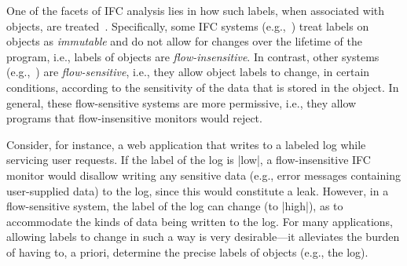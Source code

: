 One of the facets of IFC analysis lies in how such labels, when associated with
objects, are treated~\cite{Hunt:2006}.
%
Specifically, some IFC systems (e.g.,~\cite{Breeze, Aeolus, stefan:lio,
stefan:addressing-covert, zeldovich:histar, Efstathopoulos:2005, krohn:flume})
treat labels on objects as \emph{immutable} and do not allow for changes over
the lifetime of the program, i.e., labels of objects are \emph{flow-insensitive}.
%
In contrast, other systems (e.g.,~\cite{jif, FlowCaml,
Zdancewic02programminglanguages, Austin:Flanagan:PLAS09,
Austin:Flanagan:PLAS10}) are \emph{flow-sensitive}, i.e., they allow object
labels to change, in certain conditions, according to the sensitivity of the
data that is stored in the object.
%
In general, these flow-sensitive systems are more permissive, i.e., they allow
programs that flow-insensitive monitors would reject.
 
Consider, for instance, a web application that writes to a labeled
log while servicing user requests.
%
If the label of the log is |low|, a flow-insensitive IFC monitor would disallow
writing any sensitive data (e.g., error messages containing user-supplied data)
to the log, since this would constitute a leak.
%
However, in a flow-sensitive system, the label of the log can change (to
|high|), as to accommodate the kinds of data being written to the log.
%
For many applications, allowing labels to change in such a way is very
desirable---it alleviates the burden of having to, a priori, determine the
precise labels of objects (e.g., the log).

